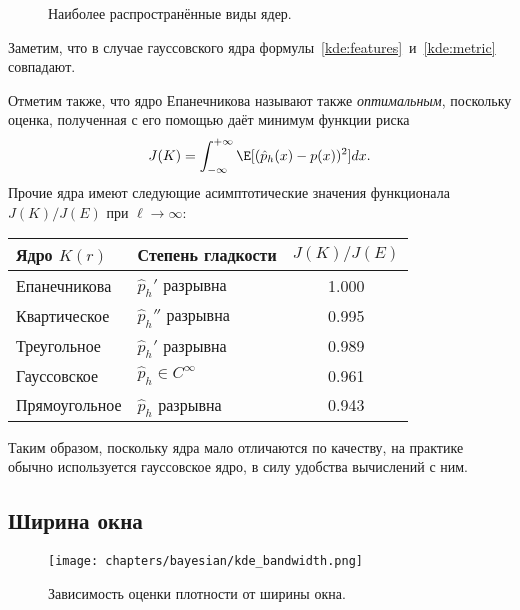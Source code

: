 {\begin{figure}[h]
\caption{Наиболее распространённые виды ядер.}\label{kde:kernels}
\end{figure}

Заметим, что в случае гауссовского ядра
формулы~\eqref{kde:features}~и~\eqref{kde:metric} совпадают.

Отметим также, что ядро Епанечникова называют также \emph{оптимальным},
поскольку оценка, полученная с его помощью даёт минимум функции риска
\[
J(K) = \int_{-\infty}^{+\infty} \E[ (\hat{p}_h(x) - p(x))^2 ] dx.
\]
Прочие ядра имеют следующие асимптотические значения функционала $J(K)/J(E)$ при
$\ell \to \infty$:
\begin{center}
\begin{tabular}{|l|l|c|}
\hline
\textbf{Ядро} $K(r)$ & \textbf{Степень гладкости} & $J(K)/J(E)$ \\
\hline
Епанечникова & $\hat{p}_h'$ разрывна & 1.000\\
Квартическое & $\hat{p}_h''$ разрывна & 0.995\\
Треугольное & $\hat{p}_h'$ разрывна & 0.989\\
Гауссовское & $\hat{p}_h\in C^\infty$ & 0.961\\
Прямоугольное & $\hat{p}_h$ разрывна & 0.943\\
\hline
\end{tabular}
\end{center}
Таким образом, поскольку ядра мало отличаются по качеству, на практике обычно
используется гауссовское ядро, в силу удобства вычислений с ним.

\subsection*{Ширина окна}
\begin{wrapfigure}{R}{0.3\textwidth}
\texttt{[image: chapters/bayesian/kde\_bandwidth.png]}
\caption{Зависимость оценки плотности от ширины окна.}\label{kde:bandwidth}
\end{wrapfigure}

}
